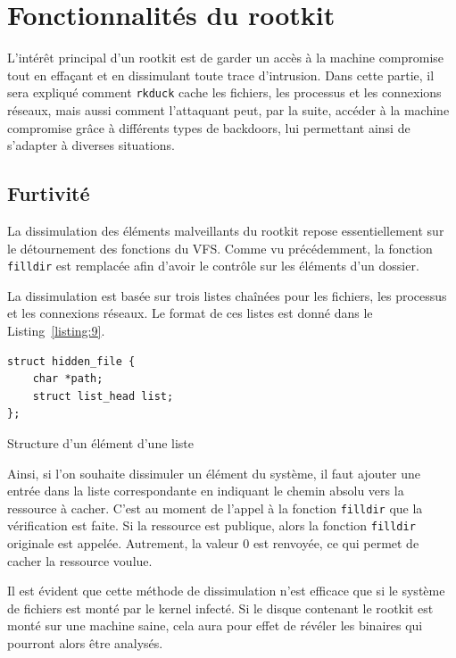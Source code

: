 \documentclass[12pt]{article}
\begin{document}
\section{Fonctionnalités du rootkit}
    
    L'intérêt principal d'un rootkit est de garder un accès à la machine compromise tout en effaçant et en dissimulant toute trace d'intrusion. Dans cette partie, il sera expliqué comment \texttt{rkduck} cache les fichiers, les processus et les connexions réseaux, mais aussi comment l'attaquant peut, par la suite, accéder à la machine compromise grâce à différents types de backdoors, lui permettant ainsi de s'adapter à diverses situations.

    \subsection{Furtivité}
        
        	La dissimulation des éléments malveillants du rootkit repose essentiellement sur le détournement des fonctions du VFS. Comme vu précédemment, la fonction \texttt{filldir} est remplacée afin d'avoir le contrôle sur les éléments d'un dossier. 

			La dissimulation est basée sur trois listes chaînées pour les fichiers, les processus et les connexions réseaux. Le format de ces listes est donné dans le Listing~\ref{listing:9}.

\begin{listing}[H]
\begin{verbatim}
struct hidden_file {
    char *path;
    struct list_head list;
};
\end{verbatim}
\caption{Structure d'un élément d'une liste}
\label{listing:9}
\end{listing}

			Ainsi, si l'on souhaite dissimuler un élément du système, il faut ajouter une entrée dans la liste correspondante en indiquant le chemin absolu vers la ressource à cacher. C'est au moment de l'appel à la fonction \texttt{filldir} que la vérification est faite. Si la ressource est publique, alors la fonction \texttt{filldir} originale  est appelée. Autrement, la valeur 0 est renvoyée, ce qui permet de cacher la ressource voulue.

			Il est évident que cette méthode de dissimulation n'est efficace que si le système de fichiers est monté par le kernel infecté. Si le disque contenant le rootkit est monté sur une machine saine, cela aura pour effet de révéler les binaires qui pourront alors être analysés.
\end{document}
